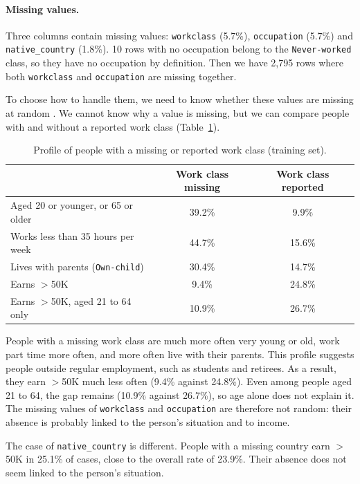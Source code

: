 \documentclass[10pt,a4paper]{article}
\newcommand{\high}{$>$50K}
\begin{document}
\paragraph{Missing values.}
Three columns contain missing values: \texttt{workclass} (5.7\%), \texttt{occupation}
(5.7\%) and \texttt{native\_country} (1.8\%). 10 rows with no occupation belong to the
\texttt{Never-worked} class, so they have no occupation by definition. Then we have 2,795 rows where both \texttt{workclass} and \texttt{occupation}
are missing together.

To choose how to handle them, we need to know whether these values are missing at random
\cite{rubin1976}. We cannot know why a value is missing, but we can
compare people with and without a reported work class (Table~\ref{tab:missing}).

\begin{table}[htbp]
\centering
\caption{Profile of people with a missing or reported work class (training set).}
\label{tab:missing}
\small
\begin{tabular}{lcc}
\toprule
 & Work class missing & Work class reported \\
\midrule
Aged 20 or younger, or 65 or older & 39.2\% & 9.9\% \\
Works less than 35 hours per week   & 44.7\% & 15.6\% \\
Lives with parents (\texttt{Own-child}) & 30.4\% & 14.7\% \\
Earns \high{}                        & 9.4\%  & 24.8\% \\
Earns \high{}, aged 21 to 64 only    & 10.9\% & 26.7\% \\
\bottomrule
\end{tabular}
\end{table}

People with a missing work class are much more often very young or old, work part time
more often, and more often live with their parents. This profile suggests people outside
regular employment, such as students and retirees. As a result, they earn \high{} much
less often (9.4\% against 24.8\%). Even among people aged 21 to 64, the gap remains (10.9\%
against 26.7\%), so age alone does not explain it. The missing values of
\texttt{workclass} and \texttt{occupation} are therefore not random: their absence is probably
linked to the person's situation and to income.

The case of \texttt{native\_country} is different. People with a missing country earn
\high{} in 25.1\% of cases, close to the overall rate of 23.9\%. Their absence does not
seem linked to the person's situation.
\end{document}
